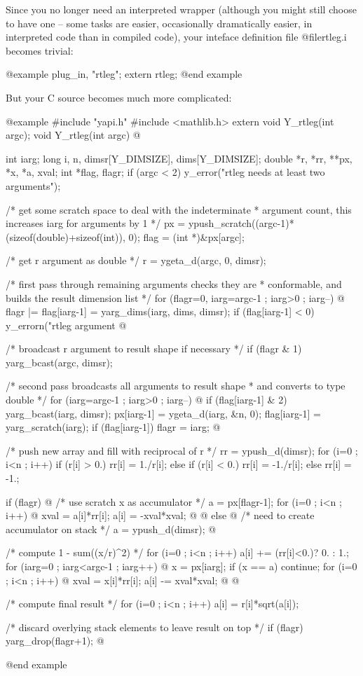 Since you no longer need an interpreted wrapper (although you might
still choose to have one -- some tasks are easier, occasionally
dramatically easier, in interpreted code than in compiled code), your
inteface definition file @file{rtleg.i} becomes trivial:

@example
plug_in, "rtleg";
extern rtleg;
@end example

But your C source becomes much more complicated:

@example
#include "yapi.h"
#include <mathlib.h>
extern void Y_rtleg(int argc);
void
Y_rtleg(int argc)
@{
  int iarg;
  long i, n, dimsr[Y_DIMSIZE], dims[Y_DIMSIZE];
  double *r, *rr, **px, *x, *a, xval;
  int *flag, flagr;
  if (argc < 2) y_error("rtleg needs at least two arguments");

  /* get some scratch space to deal with the indeterminate
   * argument count, this increases iarg for arguments by 1
   */
  px = ypush_scratch((argc-1)*(sizeof(double)+sizeof(int)), 0);
  flag = (int *)&px[argc];

  /* get r argument as double */
  r = ygeta_d(argc, 0, dimsr);

  /* first pass through remaining arguments checks they are
   * conformable, and builds the result dimension list
   */
  for (flagr=0, iarg=argc-1 ; iarg>0 ; iarg--) @{
    flagr |= flag[iarg-1] = yarg_dims(iarg, dims, dimsr);
    if (flag[iarg-1] < 0)
      y_errorn("rtleg argument %
  @}

  /* broadcast r argument to result shape if necessary */
  if (flagr & 1) yarg_bcast(argc, dimsr);

  /* second pass broadcasts all arguments to result shape
   * and converts to type double
   */
  for (iarg=argc-1 ; iarg>0 ; iarg--) @{
    if (flag[iarg-1] & 2) yarg_bcast(iarg, dimsr);
    px[iarg-1] = ygeta_d(iarg, &n, 0);
    flag[iarg-1] = yarg_scratch(iarg);
    if (flag[iarg-1]) flagr = iarg;
  @}

  /* push new array and fill with reciprocal of r */
  rr = ypush_d(dimsr);
  for (i=0 ; i<n ; i++)
    if (r[i] > 0.) rr[i] = 1./r[i];
    else if (r[i] < 0.) rr[i] = -1./r[i];
    else rr[i] = -1.;

  if (flagr) @{  /* use scratch x as accumulator */
    a = px[flagr-1];
    for (i=0 ; i<n ; i++) @{
      xval = a[i]*rr[i];
      a[i] = -xval*xval;
    @}
  @} else @{      /* need to create accumulator on stack */
    a = ypush_d(dimsr);
  @}

  /* compute 1 - sum((x/r)^2) */
  for (i=0 ; i<n ; i++) a[i] += (rr[i]<0.)? 0. : 1.;
  for (iarg=0 ; iarg<argc-1 ; iarg++) @{
    x = px[iarg];
    if (x == a) continue;
    for (i=0 ; i<n ; i++) @{
      xval = x[i]*rr[i];
      a[i] -= xval*xval;
    @}
  @}

  /* compute final result */
  for (i=0 ; i<n ; i++) a[i] = r[i]*sqrt(a[i]);

  /* discard overlying stack elements to leave result on top */
  if (flagr) yarg_drop(flagr+1);
@}
@end example

